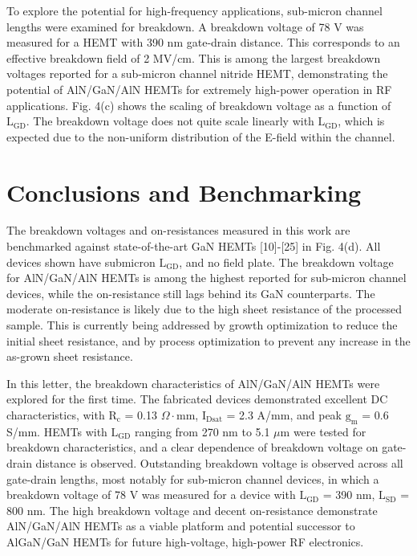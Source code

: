 \documentclass[journal]{IEEEtran}
\begin{document}
To explore the potential for high-frequency applications, sub-micron channel lengths were examined for breakdown. A breakdown voltage of 78 V was measured for a HEMT with 390 nm gate-drain distance. This corresponds to an effective breakdown field of 2 MV/cm. This is among the largest breakdown voltages reported for a sub-micron channel nitride HEMT, demonstrating the potential of AlN/GaN/AlN HEMTs for extremely high-power operation in RF applications. Fig. 4(c) shows the scaling of breakdown voltage as a function of $\mathrm{L_{GD}}$. The breakdown voltage does not quite scale linearly with $\mathrm{L_{GD}}$, which is expected due to the non-uniform distribution of the E-field within the channel.

\section{Conclusions and Benchmarking}
The breakdown voltages and on-resistances measured in this work are benchmarked against state-of-the-art GaN HEMTs [10]-[25] in Fig. 4(d). All devices shown have submicron $\mathrm{L_{GD}}$, and no field plate. The breakdown voltage for AlN/GaN/AlN HEMTs is among the highest reported for sub-micron channel devices, while the on-resistance still lags behind its GaN counterparts. The moderate on-resistance is likely due to the high sheet resistance of the processed sample. This is currently being addressed by growth optimization to reduce the initial sheet resistance, and by process optimization to prevent any increase in the as-grown sheet resistance.

In this letter, the breakdown characteristics of AlN/GaN/AlN HEMTs were explored for the first time. The fabricated devices demonstrated excellent DC characteristics, with $\mathrm{R_c}$ = 0.13 $\Omega\cdot$mm, $\mathrm{I_{Dsat}}$ = 2.3 A/mm, and peak $\mathrm{g_m}$ = 0.6 S/mm. HEMTs with $\mathrm{L_{GD}}$ ranging from 270 nm to 5.1 $\mu$m were tested for breakdown characteristics, and a clear dependence of breakdown voltage on gate-drain distance is observed. Outstanding breakdown voltage is observed across all gate-drain lengths, most notably for sub-micron channel devices, in which a breakdown voltage of 78 V was measured for a device with $\mathrm{L_{GD}}$ = 390 nm, $\mathrm{L_{SD}}$ = 800 nm. The high breakdown voltage and decent on-resistance demonstrate AlN/GaN/AlN HEMTs as a viable platform and potential successor to AlGaN/GaN HEMTs for future high-voltage, high-power RF electronics.

\vfill
\end{document}
